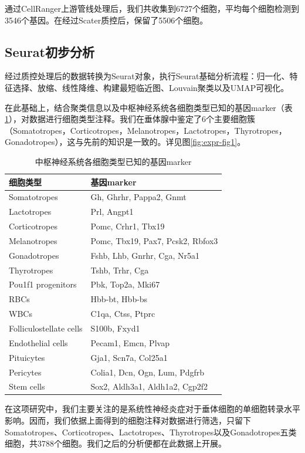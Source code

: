   通过CellRanger上游管线处理后，我们共收集到6727个细胞，平均每个细胞检测到3546个基因。在经过Scater质控后，保留了5506个细胞。
\subsection{Seurat初步分析}
  经过质控处理后的数据转换为Seurat对象，执行Seurat基础分析流程：归一化、特征选择、放缩、线性降维、构建最短临近图、Louvain聚类以及UMAP可视化。

  在此基础上，结合聚类信息以及中枢神经系统各细胞类型已知的基因marker（表\ref{tab:gene-marker}），对数据进行细胞类型注释。我们在垂体腺中鉴定了6个主要细胞簇（Somatotropes，Corticotropes，Melanotropes，Lactotropes，Thyrotropes，Gonadotropes），这与先前的知识是一致的。详见图\ref{fig:expr-fig1}。
\begin{table}[ht]
    \centering
    \caption{中枢神经系统各细胞类型已知的基因marker}
    \label{tab:gene-marker}
    \begin{tabular}{ll}
        \toprule
        细胞类型 & 基因marker \\
        \midrule
        Somatotropes & Gh, Ghrhr, Pappa2, Gnmt \\
        Lactotropes & Prl, Angpt1 \\
        Corticotropes & Pomc, Crhr1, Tbx19 \\
        Melanotropes & Pomc, Tbx19, Pax7, Pcsk2, Rbfox3 \\
        Gonadotropes & Fshb, Lhb, Gnrhr, Cga, Nr5a1 \\
        Thyrotropes & Tshb, Trhr, Cga \\
        Pou1f1 progenitors & Pbk, Top2a, Mki67 \\
        RBCs & Hbb-bt, Hbb-bs \\
        WBCs & C1qa, Ctss, Ptprc \\
        Folliculostellate cells & S100b, Fxyd1 \\
        Endothelial cells & Pecam1, Emcn, Plvap \\
        Pituicytes & Gja1, Scn7a, Col25a1 \\
        Pericytes & Colia1, Dcn, Ogn, Lum, Pdgfrb \\
        Stem cells & Sox2, Aldh3a1, Aldh1a2, Cgp2f2 \\
        \bottomrule
    \end{tabular}
\end{table}

  在这项研究中，我们主要关注的是系统性神经炎症对于垂体细胞的单细胞转录水平影响。因而，我们依据上面得到的细胞注释对数据进行筛选，只留下Somatotropes、Corticotropes、Lactotropes、Thyrotropes以及Gonadotropes五类细胞，共3788个细胞。我们之后的分析便都在此数据上开展。

